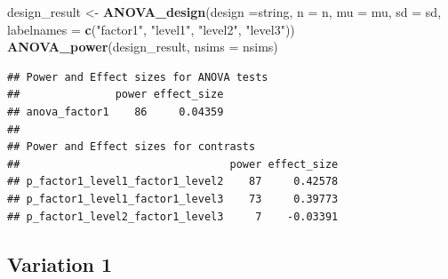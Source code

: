 \documentclass[]{book}
\newenvironment{Shaded}{\begin{snugshade}}{\end{snugshade}}
\newcommand{\DataTypeTok}[1]{\textcolor[rgb]{0.13,0.29,0.53}{#1}}
\newcommand{\KeywordTok}[1]{\textcolor[rgb]{0.13,0.29,0.53}{\textbf{#1}}}
\newcommand{\NormalTok}[1]{#1}
\newcommand{\StringTok}[1]{\textcolor[rgb]{0.31,0.60,0.02}{#1}}
\begin{document}
\begin{Shaded}
\begin{Highlighting}[]
\NormalTok{design_result <-}\StringTok{ }\KeywordTok{ANOVA_design}\NormalTok{(}\DataTypeTok{design =}\NormalTok{string,}
                   \DataTypeTok{n =}\NormalTok{ n, }
                   \DataTypeTok{mu =}\NormalTok{ mu, }
                   \DataTypeTok{sd =}\NormalTok{ sd, }
                   \DataTypeTok{labelnames =} \KeywordTok{c}\NormalTok{(}\StringTok{"factor1"}\NormalTok{, }\StringTok{"level1"}\NormalTok{, }\StringTok{"level2"}\NormalTok{, }\StringTok{"level3"}\NormalTok{))}
\KeywordTok{ANOVA_power}\NormalTok{(design_result, }\DataTypeTok{nsims =}\NormalTok{ nsims)}
\end{Highlighting}
\end{Shaded}

\begin{verbatim}
## Power and Effect sizes for ANOVA tests
##               power effect_size
## anova_factor1    86     0.04359
## 
## Power and Effect sizes for contrasts
##                                 power effect_size
## p_factor1_level1_factor1_level2    87     0.42578
## p_factor1_level1_factor1_level3    73     0.39773
## p_factor1_level2_factor1_level3     7    -0.03391
\end{verbatim}

\hypertarget{variation-1}{%
\subsection{Variation 1}\label{variation-1}}
\end{document}
